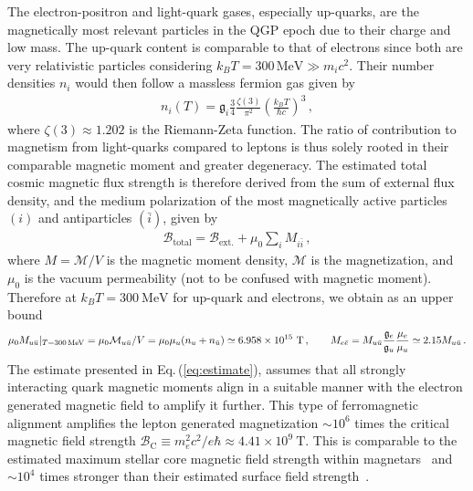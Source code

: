 \documentclass[epjST]{svjour}
\newcommand*{\MeV}{\text{\,MeV}}
\newcommand{\req}[1]{Eq.\,(\ref{#1})}
\begin{document}
The electron-positron and light-quark gases, especially up-quarks, are the magnetically most relevant particles in the QGP epoch due to their charge and low mass. The up-quark content is comparable to that of electrons since both are very relativistic particles considering \(k_{B}T=300\,\mathrm{MeV}\gg m_i c^{2}\). Their number densities \(n_{i}\) would then follow a massless fermion gas given by
\begin{align}
n_{i}(T) = \mathfrak{g}_{i}\frac{3}{4}\frac{\zeta(3)}{\pi^{2}}\left(\frac{k_{B}T}{\hbar c}\right)^{3}\,,
\end{align}
where \(\zeta(3)\approx1.202\) is the Riemann-Zeta function. The ratio of contribution to magnetism from light-quarks compared to leptons is thus solely rooted in their comparable magnetic moment and greater degeneracy. The estimated total cosmic magnetic flux strength is therefore derived from the sum of external flux density, and the medium polarization of the most magnetically active particles \((i)\) and antiparticles \((\bar{i})\), given by
\begin{align}
\mathcal{B}_\mathrm{total}=\mathcal{B}_\mathrm{ext.}+\mu_{0}\sum_{i} M_{i\bar{i}}\,,
\end{align}
where \(M=\mathcal{M}/V\) is the magnetic moment density, \(\mathcal{M}\) is the magnetization, and \(\mu_{0}\) is the vacuum permeability (not to be confused with magnetic moment). Therefore at \(k_{B}T=300~\mathrm{MeV}\) for up-quark and electrons, we obtain as an upper bound
\begin{align}
\label{eq:estimate}
\mu_{0}M_{u\bar{u}}\vert_{T=300\MeV} = \mu_{0}\mathcal{M}_{u\bar{u}}/V = \mu_{0}\mu_{u}(n_{u}+n_{\bar{u}}) \simeq 6.958\times10^{15}~\mathrm{T} \,,\qquad
M_{e\bar{e}}=M_{u\bar{u}}\frac{\mathfrak{g}_{e}}{\mathfrak{g}_{u}} \frac{\mu_{e}}{\mu_{u}} \simeq 2.15 M_{u\bar{u}}\,.
\end{align}
The estimate presented in \req{eq:estimate}, assumes that all strongly interacting quark magnetic moments align in a suitable manner with the electron generated magnetic field to amplify it further. This type of ferromagnetic alignment amplifies the lepton generated magnetization \(\sim 10^{6}\) times the critical magnetic field strength \(\mathcal{B}_\mathrm{C}\equiv m_{e}^{2}c^{2}/e\hbar\approx 4.41\times10^{9}\ \mathrm{T}\). This is comparable to the estimated maximum stellar core magnetic field strength within magnetars~\cite{Ferrer:2010wz} and \(\sim 10^{4}\) times stronger than their estimated surface field strength~\cite{Kaspi:2017fwg}.
\end{document}
